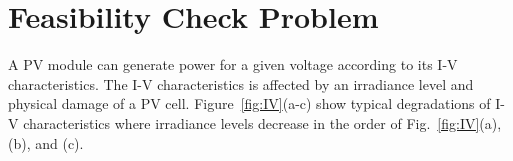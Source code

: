 \documentclass[conference]{IEEEtran}
\begin{document}







\section{Feasibility Check Problem}\label{Sec4}
A PV module can generate power for a given voltage according to its I-V characteristics. The I-V characteristics is affected by an irradiance level and physical damage of a PV cell. Figure~\ref{fig:IV}(a-c) show typical degradations of I-V characteristics where irradiance levels decrease in the order of Fig.~\ref{fig:IV}(a), (b), and (c).
\end{document}
